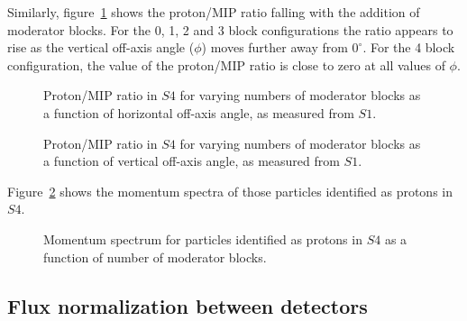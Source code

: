      Similarly, figure~\ref{fig:propiratio_s4_vert} shows the proton/MIP ratio falling with the addition of moderator blocks.
     For the 0, 1, 2 and 3 block configurations the ratio appears to rise as the vertical off-axis angle ($\phi$) moves further away from $0^{\circ}$. 
     For the 4 block configuration, the value of the proton/MIP ratio is close to zero at all values of $\phi$.
     
   	\begin{figure}[ht]
   		\begin{minipage}[t]{0.48\textwidth}
   			\begin{adjustbox}{max totalsize={\textwidth}{.35\textheight}, center}
   				
   			\end{adjustbox}
   			\caption{Proton/MIP ratio in $S4$ for varying numbers of moderator blocks as a function of horizontal off-axis angle, as measured from $S1$.}
   			\label{fig:propiratio_s4_horz}
   		\end{minipage}
   		\hspace{0.3cm}
    	\begin{minipage}[t]{0.48\textwidth}
    		\begin{adjustbox}{max totalsize={\textwidth}{.35\textheight}, center}
	    		
	    	\end{adjustbox}
    		\caption{Proton/MIP ratio in $S4$ for varying numbers of moderator blocks as a function of vertical off-axis angle, as measured from $S1$.}
    		\label{fig:propiratio_s4_vert}
    	\end{minipage}	
   	\end{figure}
   
	Figure~\ref{fig:s4promom} shows the momentum spectra of those particles identified as protons in $S4$.
	
   	\begin{figure}[ht]
   		\centering
   		\begin{adjustbox}{max totalsize={0.8\textwidth}, center}
   			
   		\end{adjustbox}
   		\caption{Momentum spectrum for particles identified as protons in $S4$ as a function of number of moderator blocks.}
   		\label{fig:s4promom}
   	\end{figure}
   
	\subsection{Flux normalization between detectors}
	

